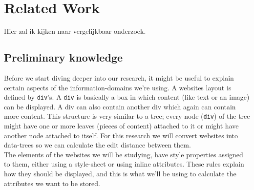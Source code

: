 \chapter{Related Work}\label{relatedwork}
Hier zal ik kijken naar vergelijkbaar onderzoek.

\section{Preliminary knowledge}
Before we start diving deeper into our research, it might be useful to explain certain aspects of the information-domains we're using.
A websites layout is defined by \texttt{div}'s. A \texttt{div} is basically a box in which content (like text or an image) can be displayed. A div can also contain another div which again can contain more content. This structure is very similar to a tree; every node (\texttt{div}) of the tree might have one or more leaves (pieces of content) attached to it or might have another node attached to itself. For this research we will convert websites into data-trees so we can calculate the edit distance between them.\\
The elements of the websites we will be studying, have style properties assigned to them, either using a style-sheet or using inline attributes. These rules explain how they should be displayed, and this is what we'll be using to calculate the attributes we want to be stored.
